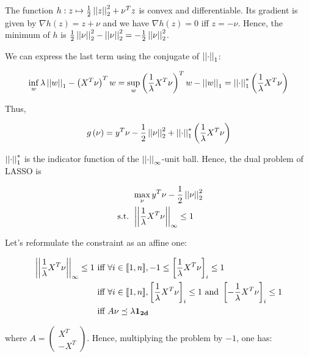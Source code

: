 \documentclass[a4paper, 11pt]{report}
\begin{document}
\begin{enumerate}
    The function $h: z \mapsto \frac{1}{2} \left|\left| z \right|\right|_{2}^{2} + \nu^{T} z$ is convex and differentiable. Its gradient is given by $\nabla h (z) = z + \nu$ and we have $\nabla h(z) = 0$ iff $z = - \nu$. Hence, the minimum of $h$ is $\frac{1}{2} \left|\left| \nu \right|\right|_{2}^{2} - \left|\left| \nu \right|\right|_{2}^{2} = - \frac{1}{2} \left|\left| \nu \right|\right|_{2}^{2}$.
    
    We can express the last term using the conjugate of $\left|\left| \cdot \right|\right|_{1}$:
    
    \[ \inf_{w} \lambda \left|\left| w \right|\right|_{1} - \left( X^{T} \nu \right)^{T} w = \sup_{w} \left( \frac{1}{\lambda} X^{T} \nu \right)^{T} w - \left|\left| w \right|\right|_{1} = \left|\left| \cdot \right|\right|_{1}^{*} \left( \frac{1}{\lambda} X^{T} \nu \right) \]
    
    Thus,
    
    \[ g \left( \nu \right) = y^{T} \nu - \frac{1}{2} \left|\left| \nu \right|\right|_{2}^{2} + \left|\left| \cdot \right|\right|_{1}^{*} \left( \frac{1}{\lambda} X^{T} \nu \right) \]
    
    $\left|\left| \cdot \right|\right|_{1}^{*}$ is the indicator function of the $\left|\left| \cdot \right|\right|_{\infty}$-unit ball. Hence, the dual problem of LASSO is
    
    \begin{equation*}
        \begin{aligned}
        & \max_{\nu} y^{T} \nu - \frac{1}{2} \left|\left| \nu \right|\right|_{2}^{2} \\
        \text{ s.t. } & \left|\left| \frac{1}{\lambda} X^{T} \nu \right|\right|_{\infty} \leq 1
        \end{aligned}
    \end{equation*}
    
    Let's reformulate the constraint as an affine one:
    
    \begin{equation*}
    	\begin{aligned}
    	\left|\left| \frac{1}{\lambda} X^{T} \nu \right|\right|_{\infty} \leq 1 &\text{ iff } \forall i \in [\![ 1, n ]\!], -1 \leq \left[ \frac{1}{\lambda} X^{T} \nu \right]_{i} \leq 1 \\
    	&\text{ iff } \forall i \in [\![ 1, n ]\!], \left[ \frac{1}{\lambda} X^{T} \nu \right]_{i} \leq 1 \text{ and } \left[ - \frac{1}{\lambda} X^{T} \nu \right]_{i} \leq 1 \\
    	&\text{ iff } A \nu \preceq \lambda \mathbf{1_{2d}}
    	\end{aligned}
    \end{equation*}
	
	where $A = \left( \begin{array}{c}
				X^{T} \\
				- X^{T}
			   \end{array} \right)$. Hence, multiplying the problem by $-1$, one has:
			   

\end{enumerate}
\end{document}
